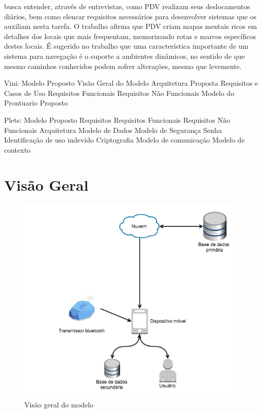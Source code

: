\documentclass[english,brazilian]{UNISINOSmonografia}
\begin{document}
 busca entender, através de entrevistas, como PDV realizam seus deslocamentos diários, bem como elencar requisitos necessários para desenvolver sistemas que os auxiliam nesta tarefa. O trabalho afirma que PDV criam mapas mentais ricos em detalhes dos locais que mais frequentam, memorizando rotas e marcos específicos destes locais. É sugerido no trabalho que uma característica importante de um sistema para navegação é o suporte a ambientes dinâmicos, no sentido de que mesmo caminhos conhecidos podem sofrer alterações, mesmo que levemente.




Vini:
Modelo Proposto
	Visão Geral do Modelo
	Arquitetura Proposta
	Requisitos e Casos de Uso
		Requisitos Funcionais
		Requisitos Não Funcionais
	Modelo do Prontuario Proposto


Plets:
Modelo Proposto
	Requisitos
		Requisitos Funcionais
		Requisitos Não Funcionais
	Arquitetura
	Modelo de Dados
	Modelo de Segurança
		Senha
		Identificação de uso indevido
		Criptografia
	Modelo de comunicação
	Modelo de contexto


	\section{Visão Geral}

\FloatBarrier
\begin{figure}
	\caption{Visão geral do modelo}
	\label{fig:blablabla}
	\centering%
	\begin{minipage}{.8\textwidth}
		\includegraphics[width=\textwidth]{imgs/visaoGeral}
	\end{minipage}
\end{figure}
\FloatBarrier
\end{document}
